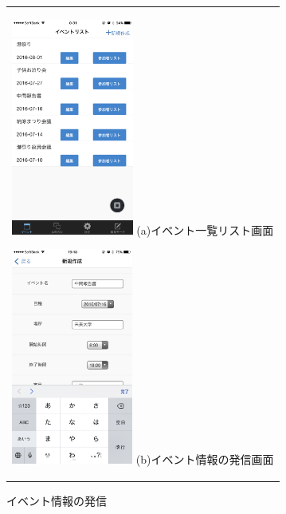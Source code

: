 \begin{figure}[htbp]
  \begin{center}
    \begin{tabular}{c}

      \begin{minipage}{0.33\hsize}
        \begin{center}
\includegraphics[width=4cm]{event_list.PNG}
          \hspace{1cm} %
          {\footnotesize (a)イベント一覧リスト画面}
        \end{center}
      \end{minipage}

      \begin{minipage}{0.33\hsize}
        \begin{center}
\includegraphics[width=4cm]{event_add.png}
          \hspace{1cm}%
          {\footnotesize (b)イベント情報の発信画面}
        \end{center}
      \end{minipage}

    \end{tabular}
    \caption{イベント情報の発信}
    \label{fig:lena}
  \end{center}
\end{figure}

